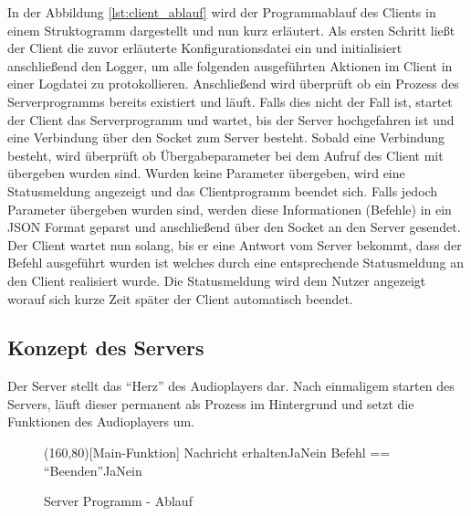 In der Abbildung \ref{lst:client_ablauf} wird der Programmablauf des Clients in
einem Struktogramm dargestellt und nun kurz erläutert. Als ersten Schritt ließt
der Client die zuvor erläuterte Konfigurationsdatei ein und initialisiert
anschließend den Logger, um alle folgenden ausgeführten Aktionen im Client in
einer Logdatei zu protokollieren. Anschließend wird überprüft ob ein Prozess
des Serverprogramms bereits existiert und läuft. Falls dies nicht der Fall ist,
startet der Client das Serverprogramm und wartet, bis der Server hochgefahren
ist und eine Verbindung über den Socket zum Server besteht. Sobald eine
Verbindung besteht, wird überprüft ob Übergabeparameter bei dem Aufruf des
Client mit übergeben wurden sind. Wurden keine Parameter übergeben, wird eine
Statusmeldung angezeigt und das Clientprogramm beendet sich. Falls jedoch
Parameter übergeben wurden sind, werden diese Informationen (Befehle) in ein
\ac{JSON} Format geparst und anschließend über den Socket an den Server
gesendet. Der Client wartet nun solang, bis er eine Antwort vom Server bekommt,
dass der Befehl ausgeführt wurden ist welches durch eine entsprechende
Statusmeldung an den Client realisiert wurde. Die Statusmeldung wird dem Nutzer
angezeigt worauf sich kurze Zeit später der Client automatisch beendet.

\subsection{Konzept des Servers}

Der Server stellt das \enquote{Herz} des Audioplayers dar. Nach einmaligem
starten des Servers, läuft dieser permanent als Prozess im Hintergrund und
setzt die Funktionen des Audioplayers um.

\begin{figure}[H]
    \begin{struktogramm}(160,80)[Main-Funktion] 
        	 {Nachricht erhalten}{Ja}{Nein}
        	     {Befehl == \enquote{Beenden}}{Ja}{Nein}
        	    	\change
        	    \ifend
        		\change
        	\ifend
        \whileend
    \end{struktogramm} 
\caption{Server Programm - Ablauf} 
\label{lst:server_ablauf} 
\end{figure}

